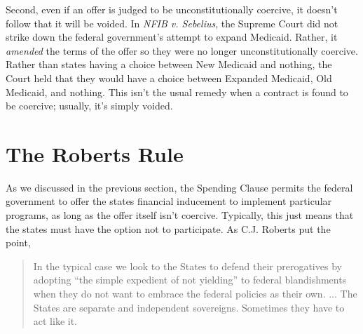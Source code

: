 \documentclass[
  11pt,
  letterpaper,
  DIV=11,
  numbers=noendperiod,
  oneside]{scrartcl}
\begin{document}
Second, even if an offer is judged to be unconstitutionally coercive, it
doesn't follow that it will be voided. In \emph{NFIB v. Sebelius}, the
Supreme Court did not strike down the federal government's attempt to
expand Medicaid. Rather, it \emph{amended} the terms of the offer so
they were no longer unconstitutionally coercive. Rather than states
having a choice between New Medicaid and nothing, the Court held that
they would have a choice between Expanded Medicaid, Old Medicaid, and
nothing. This isn't the usual remedy when a contract is found to be
coercive; usually, it's simply voided.

\section{The Roberts Rule}\label{the-roberts-rule}

As we discussed in the previous section, the Spending Clause permits the
federal government to offer the states financial inducement to implement
particular programs, as long as the offer itself isn't coercive.
Typically, this just means that the states must have the option not to
participate. As C.J. Roberts put the point,

\begin{quote}
In the typical case we look to the States to defend their prerogatives
by adopting ``the simple expedient of not yielding'' to federal
blandishments when they do not want to embrace the federal policies as
their own. ... The States are separate and independent sovereigns.
Sometimes they have to act like it.
\end{quote}
\end{document}
